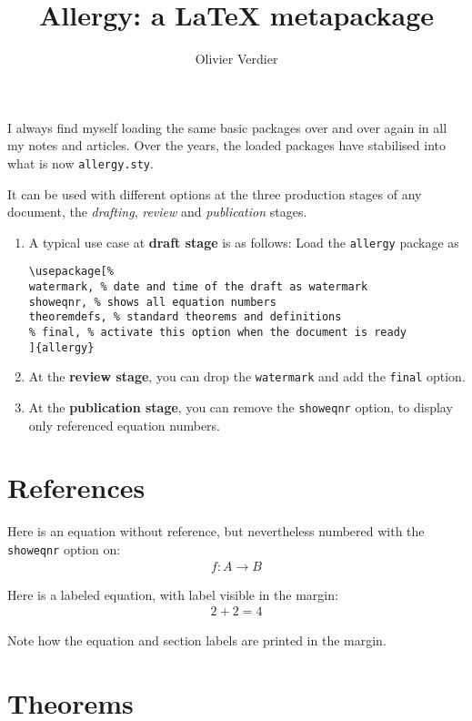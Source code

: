 \documentclass{scrartcl}
\title{Allergy: a \LaTeX{} metapackage}
\author{Olivier Verdier}
\begin{document}
\maketitle

I always find myself loading the same basic packages over and over again in all my notes and articles.
Over the years, the loaded packages have stabilised into what is now \verb|allergy.sty|.

It can be used with different options at the three production stages of any document, the \emph{drafting}, \emph{review} and \emph{publication} stages.

\begin{enumerate}
  \item
A typical use case at \textbf{draft stage} is as follows:
Load the \verb|allergy| package as
\begin{verbatim}
\usepackage[%
watermark, % date and time of the draft as watermark
showeqnr, % shows all equation numbers
theoremdefs, % standard theorems and definitions
% final, % activate this option when the document is ready
]{allergy}
\end{verbatim}
\item
At the \textbf{review stage}, you can drop the \verb|watermark| and add the \verb|final| option.
\item
At the \textbf{publication stage}, you can remove the \verb|showeqnr| option, to display only referenced equation numbers.
\end{enumerate}

\section{References}
\label{sec:references}

Here is an equation without reference, but nevertheless numbered with the \texttt{showeqnr} option on:
\begin{align}
f \colon A \to B
\end{align}

Here is a labeled equation, with label visible in the margin:
\begin{align}
\label{eq:important}
2 + 2 = 4
\end{align}

Note how the equation and section labels are printed in the margin.

\section{Theorems}
\end{document}
